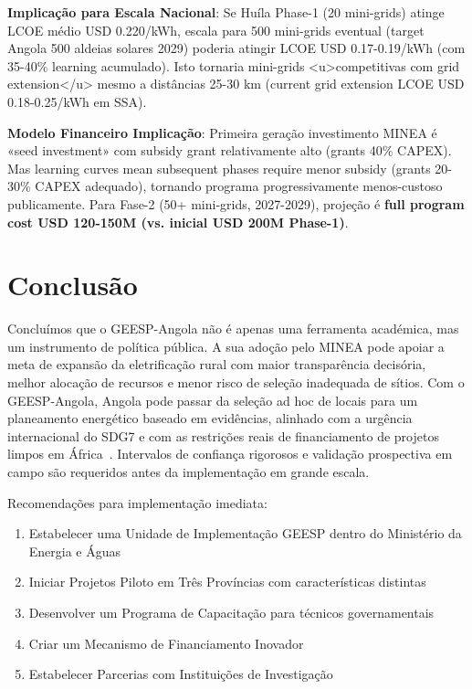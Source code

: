 \documentclass[12pt, a4paper]{article}
\begin{document}
\textbf{Implicação para Escala Nacional}: Se Huíla Phase-1 (20 mini-grids) atinge LCOE médio USD 0.220/kWh, escala para 500 mini-grids eventual (target Angola 500 aldeias solares 2029) poderia atingir LCOE USD 0.17-0.19/kWh (com 35-40\% learning acumulado). Isto tornaria mini-grids <u>competitivas com grid extension</u> mesmo a distâncias 25-30 km (current grid extension LCOE USD 0.18-0.25/kWh em SSA).


\textbf{Modelo Financeiro Implicação}: Primeira geração investimento MINEA é «seed investment» com subsidy grant relativamente alto (grants 40\% CAPEX). Mas learning curves mean subsequent phases require menor subsidy (grants 20-30\% CAPEX adequado), tornando programa progressivamente menos-custoso publicamente. Para Fase-2 (50+ mini-grids, 2027-2029), projeção é 
\textbf{full program cost USD 120-150M (vs. inicial USD 200M Phase-1)}.



\section{Conclusão}

Concluímos que o GEESP-Angola não é apenas uma ferramenta académica, mas um instrumento de política pública. A sua adoção pelo MINEA pode apoiar a meta de expansão da eletrificação rural com maior transparência decisória, melhor alocação de recursos e menor risco de seleção inadequada de sítios. Com o GEESP-Angola, Angola pode passar da seleção ad hoc de locais para um planeamento energético baseado em evidências, alinhado com a urgência internacional do SDG7 e com as restrições reais de financiamento de projetos limpos em África~\citep{IEA_Access2023,IEA_FinancingAfrica2023,UN_SDG7_2025}. Intervalos de confiança rigorosos e validação prospectiva em campo são requeridos antes da implementação em grande escala.

Recomendações para implementação imediata:
\begin{enumerate}
\item Estabelecer uma Unidade de Implementação GEESP dentro do Ministério da Energia e Águas
\item Iniciar Projetos Piloto em Três Províncias com características distintas
\item Desenvolver um Programa de Capacitação para técnicos governamentais
\item Criar um Mecanismo de Financiamento Inovador
\item Estabelecer Parcerias com Instituições de Investigação
\end{enumerate}
\end{document}
